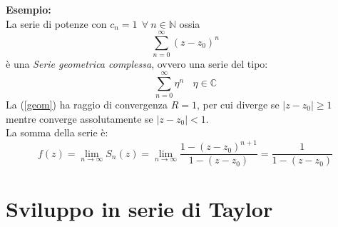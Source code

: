 \documentclass[twoside]{article}
\begin{document}
\textbf{Esempio:}
\\
La serie di potenze con $c_n=1 \ \ \forall \ n \in \mathds{N}$ ossia
\begin{equation}
    \sum_{n=0}^{\infty} (z-z_0)^n
\end{equation}
è una \textit{Serie geometrica complessa}, ovvero una serie del tipo:
\begin{equation} \label{geom}
    \sum_{n=0}^{\infty} \eta^n \ \ \ \ \eta \in \mathds{C}
\end{equation}
La (\ref{geom}) ha raggio di convergenza $R=1$, per cui diverge se $|z-z_0|\geq 1$ mentre converge assolutamente se $|z-z_0|<1$.
\\
La somma della serie è:
\begin{equation}
    f(z)=\lim_{n \to \infty} S_n(z)=\lim_{n \to \infty} \frac{1-(z-z_0)^{n+1}}{1-(z-z_0)}=\frac{1}{1-(z-z_0)}
\end{equation}
\newpage











\section{Sviluppo in serie di Taylor}
\begin{comment}
\begin{wrapfigure}[7]{L}{0.1\textwidth}
  \begin{center}
    \texttt{[image: Hadamard.jpg]}
  \end{center}
\end{wrapfigure}\leavevmode

\vspace{1.5 cm}
\epigraph{La strada più breve fra due verità del dominio reale passa per il dominio complesso.}{Jacques Hadamard}
\vspace{1.5 cm}
\end{comment}
\end{document}

